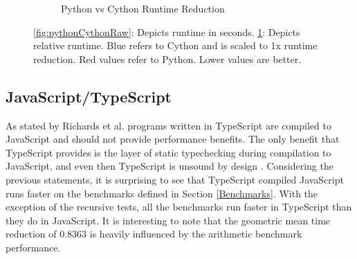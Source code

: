 \begin{figure}[H]
\begin{subfigure}{.5\textwidth}
  \caption{Python vs Cython Runtime Reduction}
  \label{fig:pythonCythonRelative}
\end{subfigure}
\caption{\ref{fig:pythonCythonRaw}: Depicts runtime in seconds. \ref{fig:pythonCythonRelative}: Depicts relative runtime. Blue refers to Cython  and is scaled to 1x runtime reduction. Red values refer to Python. Lower values are better.}
\label{fig:pythonCython}
\end{figure}



\subsection{JavaScript/TypeScript}
As stated by Richards et al. programs written in TypeScript are compiled to JavaScript and should not provide performance benefits. The only benefit that TypeScript provides is the layer of static typechecking during compilation to JavaScript, and even then TypeScript is unsound by design \cite{bierman2014understanding}. Considering the previous statements, it is surprising to see that TypeScript compiled JavaScript runs faster on the benchmarks defined in Section \ref{Benchmarks}. With the exception of the recursive tests, all the benchmarks run faster in TypeScript than they do in JavaScript. It is interesting to note that the geometric mean time reduction of 0.8363 is heavily influenced by the arithmetic benchmark performance. 



